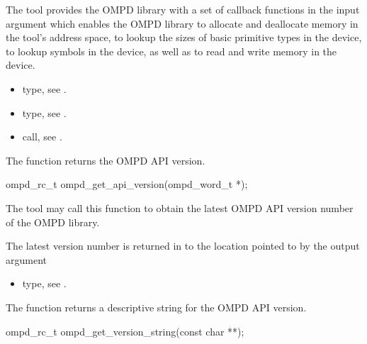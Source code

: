 The tool provides the OMPD library with a set of callback functions in the  input argument
which enables the OMPD library to allocate and deallocate memory in the tool's address space, to lookup the
sizes of basic primitive types in the device, to lookup symbols in the device, as well as to read and
write memory in the device.

\crossreferences
\begin{itemize}
  \item {} type, see .
	\item {} type, see .
	\item {} call, see .
\end{itemize}

\label{subsubsubsec:ompd_get_api_version}

\summary
The  function returns the OMPD API version.

\format

\begin{cspecific}
\begin{ompSyntax}
ompd_rc_t ompd_get_api_version(ompd_word_t *);
\end{ompSyntax}
\end{cspecific}

\descr
The tool may call this function to obtain the latest OMPD API version number of the OMPD library.

\argdesc
The latest version number is returned in to the location pointed to by the  output argument

\crossreferences
\begin{itemize}
	\item {} type, see .
\end{itemize}

\label{subsubsubsec:ompd_get_version_string}

\summary
The  function returns a descriptive string for the OMPD API version.

\format

\begin{cspecific}
\begin{ompSyntax}
ompd_rc_t ompd_get_version_string(const char **);
\end{ompSyntax}
\end{cspecific}


